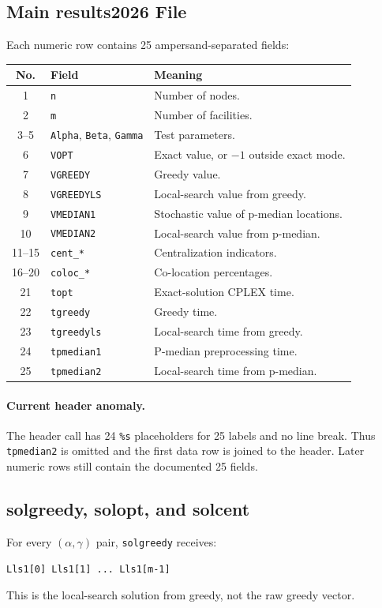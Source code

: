 \documentclass[11pt,a4paper]{article}
\newcommand{\code}[1]{\texttt{#1}}
\begin{document}
\subsection{Main results2026 File}

Each numeric row contains 25 ampersand-separated fields:
\begin{longtable}{clp{8.5cm}}
\toprule
No.&Field&Meaning\\ \midrule \endhead
1&\code{n}&Number of nodes.\\
2&\code{m}&Number of facilities.\\
3--5&\code{Alpha}, \code{Beta}, \code{Gamma}&Test parameters.\\
6&\code{VOPT}&Exact value, or $-1$ outside exact mode.\\
7&\code{VGREEDY}&Greedy value.\\
8&\code{VGREEDYLS}&Local-search value from greedy.\\
9&\code{VMEDIAN1}&Stochastic value of p-median locations.\\
10&\code{VMEDIAN2}&Local-search value from p-median.\\
11--15&\code{cent\_*}&Centralization indicators.\\
16--20&\code{coloc\_*}&Co-location percentages.\\
21&\code{topt}&Exact-solution CPLEX time.\\
22&\code{tgreedy}&Greedy time.\\
23&\code{tgreedyls}&Local-search time from greedy.\\
24&\code{tpmedian1}&P-median preprocessing time.\\
25&\code{tpmedian2}&Local-search time from p-median.\\ \bottomrule
\end{longtable}

\paragraph{Current header anomaly.}
The header call has 24 \code{\%s} placeholders for 25 labels and no line
break. Thus \code{tpmedian2} is omitted and the first data row is joined to
the header. Later numeric rows still contain the documented 25 fields.

\subsection{solgreedy, solopt, and solcent}

For every $(\alpha,\gamma)$ pair, \code{solgreedy} receives:
\begin{lstlisting}
Lls1[0] Lls1[1] ... Lls1[m-1]
\end{lstlisting}
This is the local-search solution from greedy, not the raw greedy vector.
\end{document}
